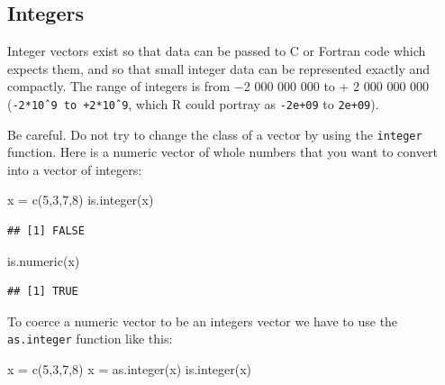 \documentclass[
]{book}
\newenvironment{Shaded}{\begin{snugshade}}{\end{snugshade}}
\newcommand{\DecValTok}[1]{\textcolor[rgb]{0.00,0.00,0.81}{#1}}
\newcommand{\FunctionTok}[1]{\textcolor[rgb]{0.00,0.00,0.00}{#1}}
\newcommand{\NormalTok}[1]{#1}
\newcommand{\OtherTok}[1]{\textcolor[rgb]{0.56,0.35,0.01}{#1}}
\begin{document}
\hypertarget{integers}{%
\subsection{Integers}\label{integers}}

Integer vectors exist so that data can be passed to C or Fortran code which expects them, and so that small integer data can be represented exactly and compactly. The range of integers is from −2 000 000 000 to + 2 000 000 000 (\texttt{-2*10ˆ9\ to\ +2*10ˆ9}, which R could portray as \texttt{-2e+09} to \texttt{2e+09}).

Be careful. Do not try to change the class of a vector by using the \texttt{integer} function. Here is a numeric vector of whole numbers that you want to convert into a vector of integers:

\begin{Shaded}
\begin{Highlighting}[]
\NormalTok{x }\OtherTok{=} \FunctionTok{c}\NormalTok{(}\DecValTok{5}\NormalTok{,}\DecValTok{3}\NormalTok{,}\DecValTok{7}\NormalTok{,}\DecValTok{8}\NormalTok{)}
\FunctionTok{is.integer}\NormalTok{(x)}
\end{Highlighting}
\end{Shaded}

\begin{verbatim}
## [1] FALSE
\end{verbatim}

\begin{Shaded}
\begin{Highlighting}[]
\FunctionTok{is.numeric}\NormalTok{(x)}
\end{Highlighting}
\end{Shaded}

\begin{verbatim}
## [1] TRUE
\end{verbatim}

To coerce a numeric vector to be an integers vector we have to use the \texttt{as.integer} function like this:

\begin{Shaded}
\begin{Highlighting}[]
\NormalTok{x }\OtherTok{=} \FunctionTok{c}\NormalTok{(}\DecValTok{5}\NormalTok{,}\DecValTok{3}\NormalTok{,}\DecValTok{7}\NormalTok{,}\DecValTok{8}\NormalTok{)}
\NormalTok{x }\OtherTok{=} \FunctionTok{as.integer}\NormalTok{(x)}
\FunctionTok{is.integer}\NormalTok{(x)}
\end{Highlighting}
\end{Shaded}
\end{document}
